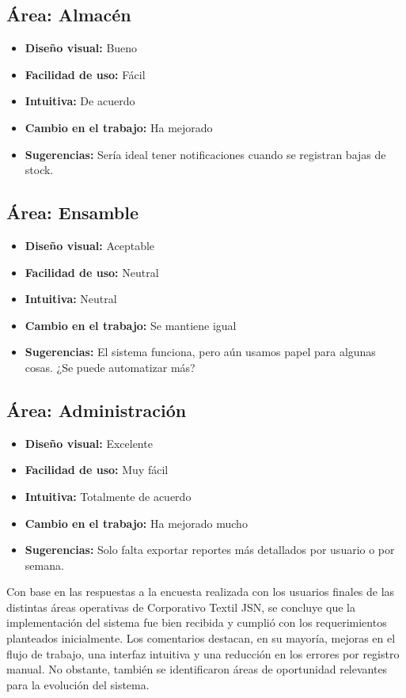 \documentclass[12pt,letterpaper,spanish]{report}
\begin{document}
\subsection*{Área: Almacén}
\begin{itemize}
    \item \textbf{Diseño visual:} Bueno
    \item \textbf{Facilidad de uso:} Fácil
    \item \textbf{Intuitiva:} De acuerdo
    \item \textbf{Cambio en el trabajo:} Ha mejorado
    \item \textbf{Sugerencias:} Sería ideal tener notificaciones cuando se registran bajas de stock.
\end{itemize}

\subsection*{Área: Ensamble}
\begin{itemize}
    \item \textbf{Diseño visual:} Aceptable
    \item \textbf{Facilidad de uso:} Neutral
    \item \textbf{Intuitiva:} Neutral
    \item \textbf{Cambio en el trabajo:} Se mantiene igual
    \item \textbf{Sugerencias:} El sistema funciona, pero aún usamos papel para algunas cosas. ¿Se puede automatizar más?
\end{itemize}

\subsection*{Área: Administración}
\begin{itemize}
    \item \textbf{Diseño visual:} Excelente
    \item \textbf{Facilidad de uso:} Muy fácil
    \item \textbf{Intuitiva:} Totalmente de acuerdo
    \item \textbf{Cambio en el trabajo:} Ha mejorado mucho
    \item \textbf{Sugerencias:} Solo falta exportar reportes más detallados por usuario o por semana.
\end{itemize}

Con base en las respuestas a la encuesta realizada con los usuarios finales de las distintas áreas operativas de Corporativo Textil JSN, se concluye que la implementación del sistema fue bien recibida y cumplió con los requerimientos planteados inicialmente. Los comentarios destacan, en su mayoría, mejoras en el flujo de trabajo, una interfaz intuitiva y una reducción en los errores por registro manual. No obstante, también se identificaron áreas de oportunidad relevantes para la evolución del sistema.
\end{document}

